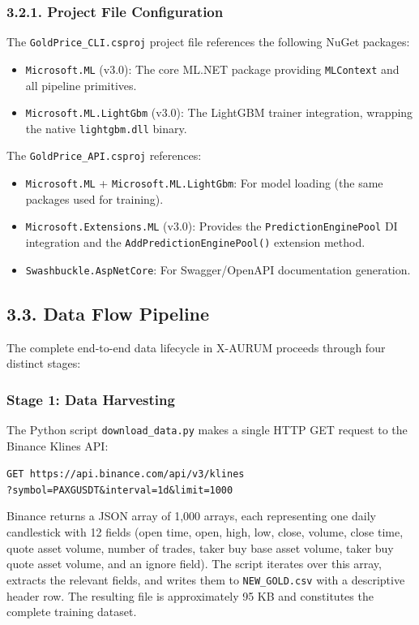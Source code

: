\subsubsection{3.2.1. Project File Configuration}
The \texttt{GoldPrice\_CLI.csproj} project file references the following NuGet packages:

\begin{itemize}
  \item \texttt{Microsoft.ML} (v3.0): The core ML.NET package providing \texttt{MLContext} and all pipeline primitives.
  \item \texttt{Microsoft.ML.LightGbm} (v3.0): The LightGBM trainer integration, wrapping the native \texttt{lightgbm.dll} binary.
\end{itemize}

The \texttt{GoldPrice\_API.csproj} references:
\begin{itemize}
  \item \texttt{Microsoft.ML} + \texttt{Microsoft.ML.LightGbm}: For model loading (the same packages used for training).
  \item \texttt{Microsoft.Extensions.ML} (v3.0): Provides the \texttt{PredictionEnginePool} DI integration and the \texttt{AddPredictionEnginePool()} extension method.
  \item \texttt{Swashbuckle.AspNetCore}: For Swagger/OpenAPI documentation generation.
\end{itemize}

\subsection{3.3. Data Flow Pipeline}

The complete end-to-end data lifecycle in X-AURUM proceeds through four distinct stages:

\subsubsection{Stage 1: Data Harvesting}
The Python script \texttt{download\_data.py} makes a single HTTP GET request to the Binance Klines API:

\begin{center}
\texttt{GET https://api.binance.com/api/v3/klines}\\
\texttt{?symbol=PAXGUSDT\&interval=1d\&limit=1000}
\end{center}


Binance returns a JSON array of 1,000 arrays, each representing one daily candlestick with 12 fields (open time, open, high, low, close, volume, close time, quote asset volume, number of trades, taker buy base asset volume, taker buy quote asset volume, and an ignore field). The script iterates over this array, extracts the relevant fields, and writes them to \texttt{NEW\_GOLD.csv} with a descriptive header row. The resulting file is approximately 95 KB and constitutes the complete training dataset.

